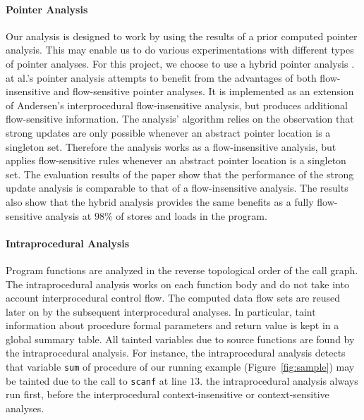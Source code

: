 \paragraph{Pointer Analysis}
Our analysis is designed to work by using the results of
a prior computed pointer analysis. This may enable us to
do various experimentations with different types of pointer
analyses. For this project, we choose to use a hybrid
pointer analysis \cite{Lhotak:2011:PAE}. \lothak{} at al.'s
pointer analysis attempts to benefit from the
advantages of both flow-insensitive and flow-sensitive 
pointer analyses. It is implemented as an extension of
Andersen's interprocedural flow-insensitive analysis, but
produces additional flow-sensitive information. The analysis'
algorithm relies on the observation that strong updates
are only possible whenever an abstract pointer location is
a singleton set. Therefore the analysis works as a
flow-insensitive analysis, but applies flow-sensitive
rules whenever an abstract pointer location is a singleton set.
The evaluation results of the paper show that the performance
of the strong update analysis is comparable to that of a
flow-insensitive analysis. The results also show that the hybrid
analysis provides the same benefits as a fully flow-sensitive
analysis at $98\%$ of stores and loads in the program.

\paragraph{Intraprocedural Analysis}
Program functions are analyzed in the reverse topological
order of the call graph.
The intraprocedural analysis works on each function body and
do not take into account interprocedural control flow.
The computed data flow sets are reused later on by the
subsequent interprocedural analyses. In particular, taint
information about procedure formal parameters and return value
is kept in a global summary table.
All tainted variables due to source functions are found by
the intraprocedural analysis. 
For instance, the intraprocedural analysis detects that variable
\texttt{sum} of procedure \compute{} of our running example
(Figure~\ref{fig:sample}) may be tainted due to the call
to \texttt{scanf} at line $13$.
the intraprocedural analysis always run first, before the
interprocedural context-insensitive or context-sensitive
analyses.

